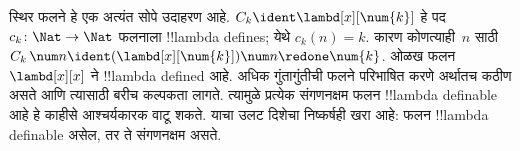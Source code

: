 \documentclass[../../../include/open-logic-section]{subfiles}
\begin{document}
स्थिर फलने हे एक अत्यंत सोपे उदाहरण आहे.
$C_k \ident \lambd[x][\num{k}]$ हे पद
$c_k\colon \Nat \to \Nat$ फलनाला
!!{lambda define}s; येथे $c_k(n) = k$.
कारण कोणत्याही~$n$ साठी $C_k \, \num n \ident
(\lambd[x][\num{k}])\num n \redone \num{k}$.
ओळख फलन $\lambd[x][x]$ ने !!{lambda defined} आहे.
अधिक गुंतागुंतीची फलने परिभाषित करणे अर्थातच
कठीण असते आणि त्यासाठी बरीच कल्पकता लागते.
त्यामुळे प्रत्येक संगणनक्षम फलन !!{lambda definable}
आहे हे काहीसे आश्चर्यकारक वाटू शकते. याचा उलट
दिशेचा निष्कर्षही खरा आहे: फलन !!{lambda definable}
असेल, तर ते संगणनक्षम असते.
\end{document}
